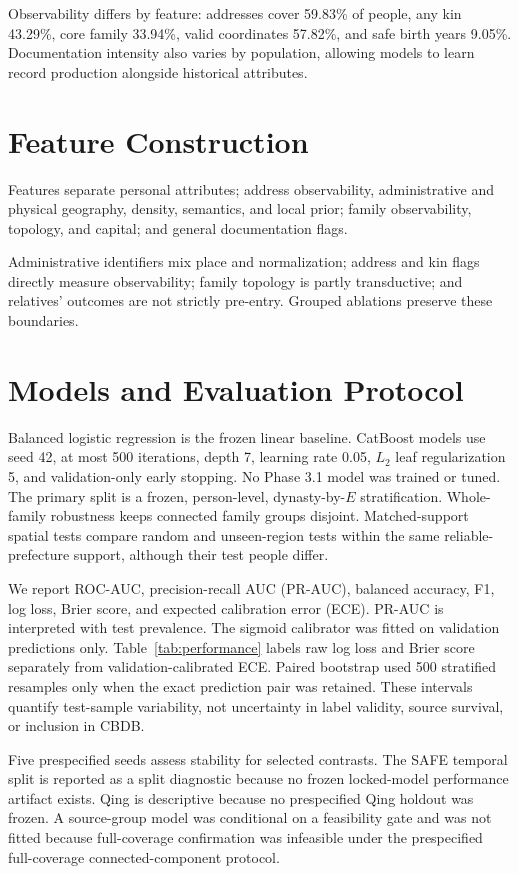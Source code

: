 \documentclass[sigconf]{acmart}
\begin{document}
Observability differs by feature: addresses cover 59.83\% of people, any kin 43.29\%, core family 33.94\%, valid coordinates 57.82\%, and safe birth years 9.05\%. Documentation intensity also varies by population, allowing models to learn record production alongside historical attributes.

\section{Feature Construction}
Features separate personal attributes; address observability, administrative and physical geography, density, semantics, and local prior; family observability, topology, and capital; and general documentation flags.

Administrative identifiers mix place and normalization; address and kin flags directly measure observability; family topology is partly transductive; and relatives' outcomes are not strictly pre-entry. Grouped ablations preserve these boundaries.

\section{Models and Evaluation Protocol}
Balanced logistic regression is the frozen linear baseline. CatBoost models use seed 42, at most 500 iterations, depth 7, learning rate 0.05, $L_2$ leaf regularization 5, and validation-only early stopping. No Phase 3.1 model was trained or tuned. The primary split is a frozen, person-level, dynasty-by-$E$ stratification. Whole-family robustness keeps connected family groups disjoint. Matched-support spatial tests compare random and unseen-region tests within the same reliable-prefecture support, although their test people differ.

We report ROC-AUC, precision-recall AUC (PR-AUC), balanced accuracy, F1, log loss, Brier score, and expected calibration error (ECE). PR-AUC is interpreted with test prevalence. The sigmoid calibrator was fitted on validation predictions only. Table~\ref{tab:performance} labels raw log loss and Brier score separately from validation-calibrated ECE. Paired bootstrap used 500 stratified resamples only when the exact prediction pair was retained. These intervals quantify test-sample variability, not uncertainty in label validity, source survival, or inclusion in CBDB.

Five prespecified seeds assess stability for selected contrasts. The SAFE temporal split is reported as a split diagnostic because no frozen locked-model performance artifact exists. Qing is descriptive because no prespecified Qing holdout was frozen. A source-group model was conditional on a feasibility gate and was not fitted because full-coverage confirmation was infeasible under the prespecified full-coverage connected-component protocol.
\end{document}
